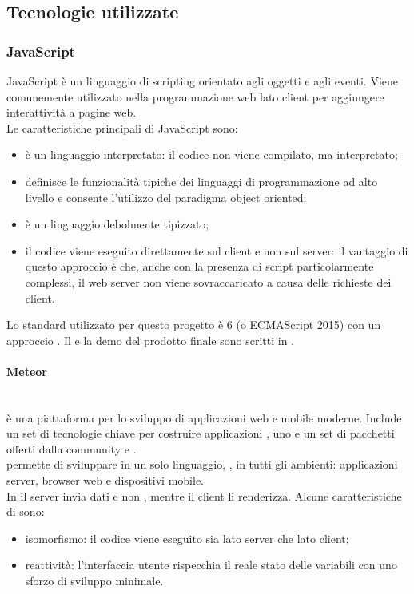 \subsection{Tecnologie utilizzate}
\subsubsection{JavaScript}
JavaScript è un linguaggio di scripting orientato agli oggetti e agli eventi. Viene comunemente utilizzato nella programmazione web lato client per aggiungere interattività a pagine web.\\
Le caratteristiche principali di JavaScript sono:
\begin{itemize}
	\item è un linguaggio interpretato: il codice non viene compilato, ma interpretato;
	\item definisce le funzionalità tipiche dei linguaggi di programmazione ad alto livello e consente l'utilizzo del paradigma object oriented;
	\item è un linguaggio debolmente tipizzato;
	\item il codice viene eseguito direttamente sul client e non sul server: il vantaggio di questo approccio è che, anche con la presenza di script particolarmente complessi, il web server non viene sovraccaricato a causa delle richieste dei client.
\end{itemize}
Lo standard utilizzato per questo progetto è  6 (o {ECMAScript} 2015) con un approccio .
Il  e la demo del prodotto finale sono scritti in .

\paragraph{Meteor}\mbox{}\\
 è una piattaforma   per lo sviluppo di applicazioni web e mobile moderne. Include un set di tecnologie chiave per costruire applicazioni , uno  e un set di pacchetti offerti dalla community  e .\\
 permette di sviluppare in un solo linguaggio, , in tutti gli ambienti: applicazioni server, browser web e dispositivi mobile.\\
In  il server invia dati e non , mentre il client li renderizza.
Alcune caratteristiche di  sono:
\begin{itemize}
	\item isomorfismo: il codice viene eseguito sia lato server che lato client;
	\item reattività: l'interfaccia utente rispecchia il reale stato delle variabili con uno sforzo di sviluppo minimale.
\end{itemize}

